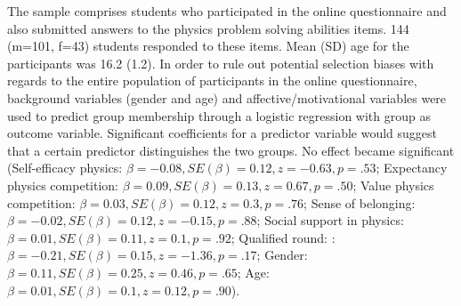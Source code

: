 \documentclass[D:/studies/WinnerS/Erhebungen/IPhO1718/paper/probsol_paper/main/TaylorFrancis/interactapasample]{subfiles}
\begin{document}
The sample comprises students who participated in the online questionnaire and also submitted answers to the physics problem solving abilities items. 144 (m=101, f=43) students responded to these items. Mean (SD) age for the participants was 16.2 (1.2). In order to rule out potential selection biases with regards to the entire population of participants in the online questionnaire, background variables (gender and age) and affective/motivational variables were used to predict group membership through a logistic regression with group as outcome variable. Significant coefficients for a predictor variable would suggest that a certain predictor distinguishes the two groups. No effect became significant (Self-efficacy physics: $\beta=-0.08, SE(\beta)=0.12, z=-0.63, p=.53$; Expectancy physics competition: $\beta=0.09, SE(\beta)=0.13, z=0.67, p=.50$; Value physics competition: $\beta=0.03, SE(\beta)=0.12, z=0.3, p=.76$; Sense of belonging: $\beta=-0.02, SE(\beta)=0.12, z=-0.15, p=.88$; Social support in physics: $\beta=0.01, SE(\beta)=0.11, z=0.1, p=.92$; Qualified round: : $\beta=-0.21, SE(\beta)=0.15, z=-1.36, p=.17$; Gender: $\beta=0.11, SE(\beta)=0.25, z=0.46, p=.65$; Age: $\beta=0.01, SE(\beta)=0.1, z=0.12, p=.90$).
\end{document}
